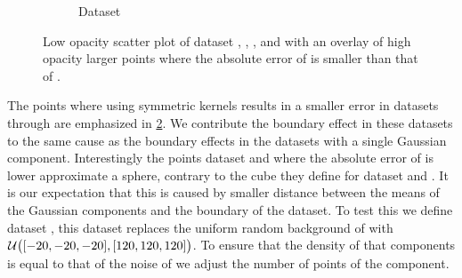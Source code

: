 \begin{figure}
\begin{subfigure}{0.23\textwidth}
			\caption{Dataset \baakmanThree}
			\label{fig:discussion:performance:mbeLowerError:baakman3}
		\end{subfigure}			
		\caption{Low opacity scatter plot of dataset %
			 \ferdosiTwo, %
			 \baakmanTwo, %
			 \ferdosiThree, and %
			 \baakmanThree %
			with an overlay of high opacity larger points where the absolute error of \mbe is smaller than that of \sambe.}
		\label{fig:discussion:performance:multisphere:mbeLowerError}
	\end{figure}	
	The points where using symmetric kernels results in a smaller error in datasets \ferdosiTwo through \baakmanThree are emphasized in
	\cref{fig:discussion:performance:multisphere:mbeLowerError}. We contribute the boundary effect in these datasets to the same cause as the boundary effects in the datasets with a single Gaussian component. Interestingly the points dataset \ferdosiThree and \baakmanThree where the absolute error of \mbe is lower approximate a sphere, contrary to the cube they define for dataset \ferdosiTwo and \baakmanTwo. It is our expectation that this is caused by smaller distance between the means of the Gaussian components and the boundary of the dataset. 
		To test this we define dataset \ferdosiThreeNoise, this dataset replaces the uniform random background of \ferdosiThree with $\mathcal{U}\big([-20, -20, -20], [120, 120, 120]\big)$. To ensure that the density of that components is equal to that of the noise of \ferdosiThree we adjust the number of points of the component. 
